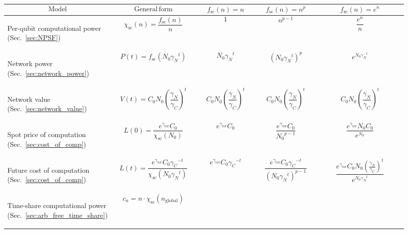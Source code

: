 \startnormtable
\renewcommand{\arraystretch}{0.5}

\begin{table}[!htbp]
{\footnotesize
\begin{tabular}{|m{0.21\linewidth}|m{0.21\linewidth}|m{0.15\linewidth}|m{0.155\linewidth}|m{0.225\linewidth}|}
	\hline
	\[\mathrm{Model}\] & \[\mathrm{General\, form}\] & \[f_\mathrm{sc}(n)=n\] & \[f_\mathrm{sc}(n)=n^p\] & \[f_\mathrm{sc}(n)=e^n\]\\
	\hline \hline
	\begin{flushleft}Per-qubit computational power (Sec.~\ref{sec:NPSF})\end{flushleft} & \[\chi_\mathrm{sc}(n)=\frac{f_\mathrm{sc}(n)}{n}\] & \[1\] & \[n^{p-1}\] & \[\frac{e^n}{n}\]\\
	\hline
	\begin{flushleft}Network power (Sec.~\ref{sec:network_power})\end{flushleft} & \[P(t)=f_\mathrm{sc}(N_0{\gamma_N}^t)\] & \[N_0{\gamma_N}^t\] & \[\left(N_0{\gamma_N}^t\right)^p\] & \[ e^{N_0{\gamma_N}^t}\] \\
	\hline
	\begin{flushleft}Network value (Sec.~\ref{sec:network_value})\end{flushleft} & \[V(t)=C_0 N_0 \left(\frac{\gamma_N}{\gamma_C}\right)^t\] & \[C_0 N_0 \left(\frac{\gamma_N}{\gamma_C}\right)^t\] & \[C_0 N_0 \left(\frac{\gamma_N}{\gamma_C}\right)^t\] & \[C_0 N_0 \left(\frac{\gamma_N}{\gamma_C}\right)^t\] \\
	\hline
	\begin{flushleft}Spot price of computation (Sec.~\ref{sec:cost_of_comp})\end{flushleft} & \[L(0)=\frac{e^{\gamma_\mathrm{ror}} C_0}{\chi_\mathrm{sc}(N_0)}\] & \[e^{\gamma_\mathrm{ror}} C_0\] &  \[\frac{e^{\gamma_\mathrm{ror}}C_0}{{N_0}^{p-1}}\] & \[\frac{e^{\gamma_\mathrm{ror}}N_0C_0}{e^{N_0}}\] \\
	\hline
	\begin{flushleft}Future cost of computation (Sec.~\ref{sec:cost_of_comp})\end{flushleft} & \[L(t)=\frac{e^{\gamma_\mathrm{ror}} C_0{\gamma_C}^{-t}}{\chi_\mathrm{sc}(N_0 {\gamma_N}^t)}
\] & \[e^{\gamma_\mathrm{ror}} C_0{\gamma_C}^{-t} \] & \[ \frac{e^{\gamma_\mathrm{ror}} C_0{\gamma_C}^{-t}}{(N_0 {\gamma_N}^t)^{p-1}}
\] & \[ \frac{e^{\gamma_\mathrm{ror}} C_0N_0 \left(\frac{\gamma_N}{\gamma_C}\right)^t}{e^{N_0 {\gamma_N}^t}}\] \\
	\hline
	\begin{flushleft}Time-share computational power (Sec.~\ref{sec:arb_free_time_share})\end{flushleft} & \[c_n=n \cdot \chi_\mathrm{sc}(n_\mathrm{global})
\]
\end{tabular}}
\end{table}
